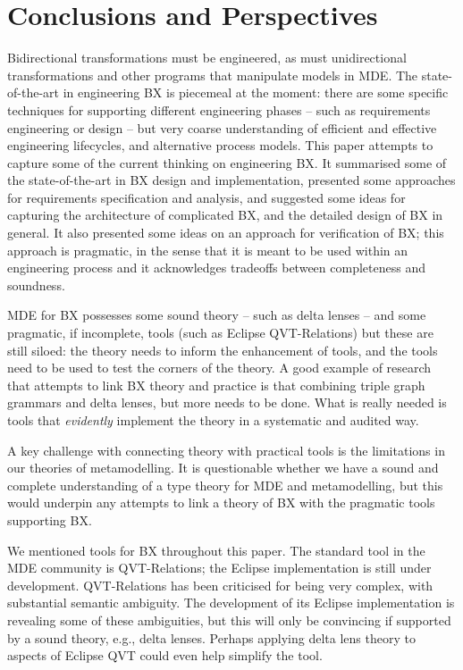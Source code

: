\section{Conclusions and Perspectives}
\label{section:conclusions}

Bidirectional transformations must be engineered, as must unidirectional transformations and other programs that manipulate models in MDE. The state-of-the-art in engineering BX is piecemeal at the moment: there are some specific techniques for supporting different engineering phases -- such as requirements engineering or design -- but very coarse understanding of efficient and effective engineering lifecycles, and alternative process models. This paper attempts to capture some of the current thinking on engineering BX. It summarised some of the state-of-the-art in BX design and implementation, presented some approaches for requirements specification and analysis, and suggested some ideas for capturing the architecture of complicated BX, and the detailed design of BX in general. It also presented some ideas on an approach for verification of BX; this approach is pragmatic, in the sense that it is meant to be used within an engineering process and it acknowledges tradeoffs between completeness and soundness.

MDE for BX possesses some sound theory -- such as delta lenses -- and some pragmatic, if incomplete, tools (such as Eclipse QVT-Relations) but these are still siloed: the theory needs to inform the enhancement of tools, and the tools need to be used to test the corners of the theory. A good example of research that attempts to link BX theory and practice is that combining triple graph grammars and delta lenses, but more needs to be done. What is really needed is tools that \textit{evidently} implement the theory in a systematic and audited way.

A key challenge with connecting theory with practical tools is the limitations in our theories of metamodelling. It is questionable whether we have a sound and complete understanding of a type theory for MDE and metamodelling, but this would underpin any attempts to link a theory of BX with the pragmatic tools supporting BX.

We mentioned tools for BX throughout this paper. The standard tool in the MDE community is QVT-Relations; the Eclipse implementation is still under development. QVT-Relations has been criticised for being very complex, with substantial semantic ambiguity. The development of its Eclipse implementation is revealing some of these ambiguities, but this will only be convincing if supported by a sound theory, e.g., delta lenses. Perhaps applying delta lens theory to aspects of Eclipse QVT could even help simplify the tool.

